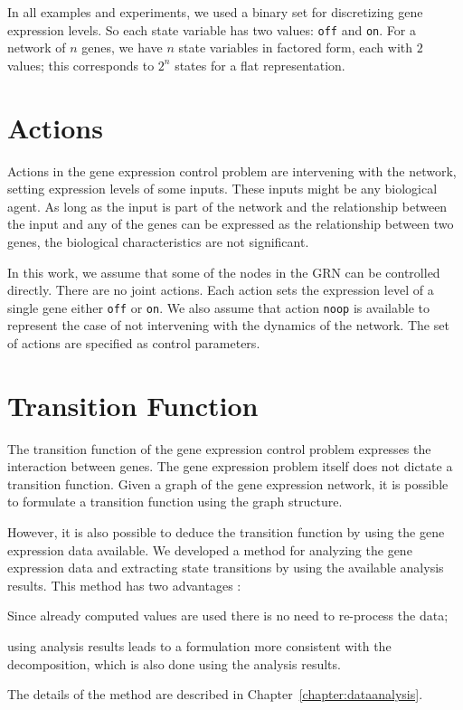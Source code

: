 In all examples and experiments, we used a binary set for discretizing gene expression levels. So each state
variable has two values: \texttt{off} and \texttt{on}. For a network of $n$ genes, we have $n$ state
variables in factored form, each with $2$ values; this corresponds to $2^n$ states for a flat representation.

\section{Actions}
Actions in the gene expression control problem are intervening with the network, setting expression levels of
some inputs. These inputs might be any biological agent. As long as the input is part of the network and the
relationship between the input and any of the genes can be expressed as the relationship between two genes,
the biological characteristics are not significant.

In this work, we assume that some of the nodes in the GRN can be controlled directly. There are no joint
actions. Each action sets the expression level of a single gene either \texttt{off} or \texttt{on}. We also
assume that action \texttt{noop} is available to represent the case of not intervening with the dynamics of
the network. The set of actions are specified as control parameters.

\section{Transition Function}
The transition function of the gene expression control problem expresses the interaction between genes. The
gene expression problem itself does not dictate a transition function. Given a graph of the gene expression
network, it is possible to formulate a transition function using the graph structure.

However, it is also possible to deduce the transition function by using the gene expression data available. We developed a method for analyzing the gene expression data and extracting state transitions by using the available analysis results. This method has two advantages :
\begin{inparaenum}
\item Since already computed values are used there is no need to re-process the data;
\item using analysis results leads to a formulation more consistent with the decomposition, which is also done using the analysis results.
\end{inparaenum}
 The details of the method are described in Chapter~\ref{chapter:dataanalysis}.

